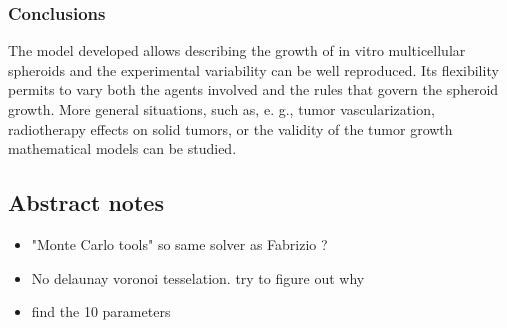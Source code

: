 \documentclass[11pt,a4paper]{article}
\begin{document}
\subsubsection*{Conclusions}
The model developed allows describing the growth of in vitro multicellular spheroids and the experimental variability can be well reproduced. Its flexibility permits to vary both the agents involved and the rules that govern the spheroid growth. More general situations, such as, e. g., tumor vascularization, radiotherapy effects on solid tumors, or the validity of the tumor growth mathematical models can be studied.

\subsection*{Abstract notes}
\begin{itemize}
\item "Monte Carlo tools" so same solver as Fabrizio ?
\item No delaunay voronoi tesselation. try to figure out why 
\item find the 10 parameters
\end{itemize}
\end{document}

